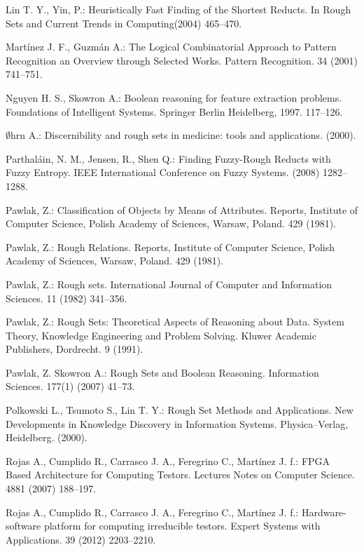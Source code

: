 \documentclass[11pt]{article}   %
\begin{document}
\begin{thebibliography}{}
	Lin T. Y., Yin, P.:
	Heuristically Fast Finding of the Shortest Reducts. 
	In Rough Sets and Current Trends in Computing(2004) 465--470.

	Mart\'inez J. F., Guzm\'an A.:
	The Logical Combinatorial Approach to Pattern Recognition an Overview through Selected Works. 
	Pattern Recognition. 34 (2001) 741--751.

	Nguyen H. S., Skowron A.:
	Boolean reasoning for feature extraction problems.
	Foundations of Intelligent Systems. Springer Berlin Heidelberg, 1997. 117--126.	
	
	$\emptyset$hrn A.:
	Discernibility and rough sets in medicine: tools and applications. (2000).	
	 
	Parthaláin, N. M., Jensen, R., Shen Q.:
	Finding Fuzzy-Rough Reducts with Fuzzy Entropy.
	IEEE International Conference on Fuzzy Systems. (2008) 1282--1288.
	
	Pawlak, Z.: 
	Classification of Objects by Means of Attributes.
	Reports, Institute of Computer Science, Polish Academy of Sciences, Warsaw, Poland. 429 (1981).

	Pawlak, Z.:
	Rough Relations.
	Reports, Institute of Computer Science, Polish Academy of Sciences, Warsaw, Poland. 429 (1981).

	Pawlak, Z.: 
	Rough sets.
	International Journal of Computer and Information Sciences. 11 (1982) 341--356.

	Pawlak, Z.: 
	Rough Sets: Theoretical Aspects of Reasoning about Data.
	System Theory, Knowledge Engineering and Problem Solving. 
	Kluwer Academic Publishers, Dordrecht. 9 (1991).
	
	Pawlak, Z. Skowron A.: 
	Rough Sets and Boolean Reasoning.
	Information Sciences. 177(1) (2007) 41--73.
	
	Polkowski L., Tsumoto S., Lin T. Y.: 
	Rough Set Methods and Applications. 
	New Developments in Knowledge Discovery in Information Systems.
	Physica–Verlag, Heidelberg. (2000).

	Rojas A., Cumplido R., Carrasco J. A., Feregrino C., Mart\'inez J. f.:
	FPGA Based Architecture for Computing Testors. 
	Lectures Notes on Computer Science. 4881 (2007) 188--197.

	Rojas A., Cumplido R., Carrasco J. A., Feregrino C., Mart\'inez J. f.:
	Hardware-software platform for computing irreducible testors. 
	Expert Systems with Applications. 39 (2012) 2203--2210.


\end{thebibliography}
\end{document}
